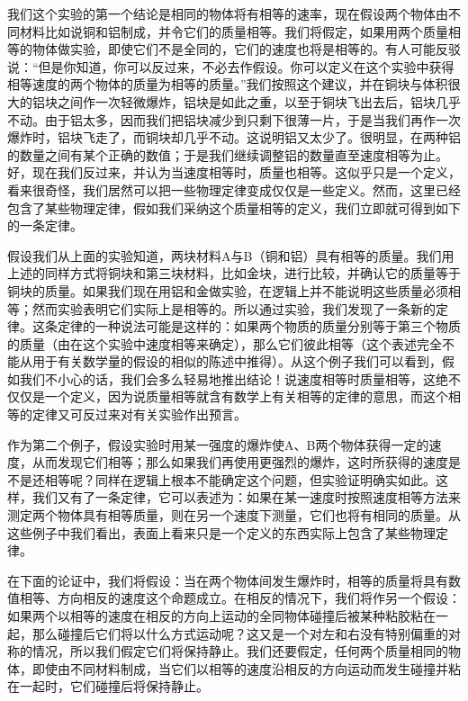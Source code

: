 我们这个实验的第一个结论是相同的物体将有相等的速率，现在假设两个物体由不同材料比如说铜和铝制成，并令它们的质量相等。我们将假定，如果用两个质量相等的物体做实验，即使它们不是全同的，它们的速度也将是相等的。有人可能反驳说：“但是你知道，你可以反过来，不必去作假设。你可以定义在这个实验中获得相等速度的两个物体的质量为相等的质量。”我们按照这个建议，并在铜块与体积很大的铝块之间作一次轻微爆炸，铝块是如此之重，以至于铜块飞出去后，铝块几乎不动。由于铝太多，因而我们把铝块减少到只剩下很薄一片，于是当我们再作一次爆炸时，铝块飞走了，而铜块却几乎不动。这说明铝又太少了。很明显，在两种铝的数量之间有某个正确的数值；于是我们继续调整铝的数量直至速度相等为止。好，现在我们反过来，并认为当速度相等时，质量也相等。这似乎只是一个定义，看来很奇怪，我们居然可以把一些物理定律变成仅仅是一些定义。然而，这里已经包含了某些物理定律，假如我们采纳这个质量相等的定义，我们立即就可得到如下的一条定律。

假设我们从上面的实验知道，两块材料A与B（铜和铝）具有相等的质量。我们用上述的同样方式将铜块和第三块材料，比如金块，进行比较，并确认它的质量等于铜块的质量。如果我们现在用铝和金做实验，在逻辑上并不能说明这些质量必须相等；然而实验表明它们实际上是相等的。所以通过实验，我们发现了一条新的定律。这条定律的一种说法可能是这样的：如果两个物质的质量分别等于第三个物质的质量（由在这个实验中速度相等来确定），那么它们彼此相等（这个表述完全不能从用于有关数学量的假设的相似的陈述中推得）。从这个例子我们可以看到，假如我们不小心的话，我们会多么轻易地推出结论！说速度相等时质量相等，这绝不仅仅是一个定义，因为说质量相等就含有数学上有关相等的定律的意思，而这个相等的定律又可反过来对有关实验作出预言。

作为第二个例子，假设实验时用某一强度的爆炸使A、B两个物体获得一定的速度，从而发现它们相等；那么如果我们再使用更强烈的爆炸，这时所获得的速度是不是还相等呢？同样在逻辑上根本不能确定这个问题，但实验证明确实如此。这样，我们又有了一条定律，它可以表述为：如果在某一速度时按照速度相等方法来测定两个物体具有相等质量，则在另一个速度下测量，它们也将有相同的质量。从这些例子中我们看出，表面上看来只是一个定义的东西实际上包含了某些物理定律。

在下面的论证中，我们将假设：当在两个物体间发生爆炸时，相等的质量将具有数值相等、方向相反的速度这个命题成立。在相反的情况下，我们将作另一个假设：如果两个以相等的速度在相反的方向上运动的全同物体碰撞后被某种粘胶粘在一起，那么碰撞后它们将以什么方式运动呢？这又是一个对左和右没有特别偏重的对称的情况，所以我们假定它们将保持静止。我们还要假定，任何两个质量相同的物体，即使由不同材料制成，当它们以相等的速度沿相反的方向运动而发生碰撞并粘在一起时，它们碰撞后将保持静止。

